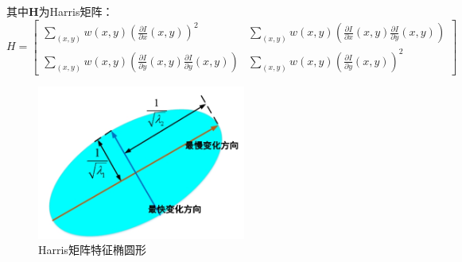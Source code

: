 \documentclass[fontset=windows]{article}
\begin{document}
其中$\mathbf{H}$为Harris矩阵：
\begin{equation*}
H=
\begin{bmatrix}
	\sum_{(x,y)}^{}w(x,y)(\frac{\partial I}{\partial x}(x,y))^2 & \sum_{(x,y)}^{}w(x,y)(\frac{\partial I}{\partial x}(x,y)\frac{\partial I}{\partial y}(x,y)) \\
	\sum_{(x,y)}^{}w(x,y)(\frac{\partial I}{\partial y}(x,y)\frac{\partial I}{\partial y}(x,y)) & \sum_{(x,y)}^{}w(x,y)(\frac{\partial I}{\partial y}(x,y))^2
\end{bmatrix}
\end{equation*}

\begin{figure}[h]
    \centering
    \includegraphics[height=2in]{harrisShape.png}
    \caption{Harris矩阵特征椭圆形}
    \label{fig:harrisShape}
\end{figure}


\end{document}
